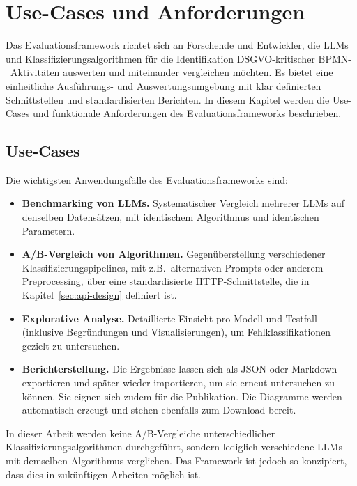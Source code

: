 \section{Use-Cases und Anforderungen}\label{sec:anforderungen-und-use-cases}

Das Evaluationsframework richtet sich an Forschende und Entwickler, die \acp{LLM} und Klassifizierungsalgorithmen für die Identifikation \ac{DSGVO}-kritischer \ac{BPMN}-\linebreak~Aktivitäten auswerten und miteinander vergleichen möchten. Es bietet eine einheitliche Ausführungs- und Auswertungsumgebung mit klar definierten Schnittstellen und standardisierten Berichten. In diesem Kapitel werden die Use-Cases und funktionale Anforderungen des Evaluationsframeworks beschrieben.

\subsection*{Use-Cases}

Die wichtigsten Anwendungsfälle des Evaluationsframeworks sind:

\begin{itemize}
    \item \textbf{Benchmarking von \acp{LLM}.} Systematischer Vergleich mehrerer \acp{LLM} auf denselben Datensätzen, mit identischem Algorithmus und identischen Parametern.
    \item \textbf{A/B-Vergleich von Algorithmen.} Gegenüberstellung verschiedener Klassifizierungspipelines, mit z.B.\ alternativen Prompts oder anderem Preprocessing, über eine standardisierte HTTP-Schnittstelle, die in Kapitel~\ref{sec:api-design} definiert ist.
    \item \textbf{Explorative Analyse.} Detaillierte Einsicht pro Modell und Testfall (inklusive Begründungen und Visualisierungen), um Fehlklassifikationen gezielt zu untersuchen.
    \item \textbf{Berichterstellung.} Die Ergebnisse lassen sich als JSON oder Markdown exportieren und später wieder importieren, um sie erneut untersuchen zu können. Sie eignen sich zudem für die Publikation. Die Diagramme werden automatisch erzeugt und stehen ebenfalls zum Download bereit.
\end{itemize}

In dieser Arbeit werden keine A/B-Vergleiche unterschiedlicher Klassifizierungsalgorithmen durchgeführt, sondern lediglich verschiedene \acp{LLM} mit demselben Algorithmus verglichen. Das Framework ist jedoch so konzipiert, dass dies in zukünftigen Arbeiten möglich ist.

